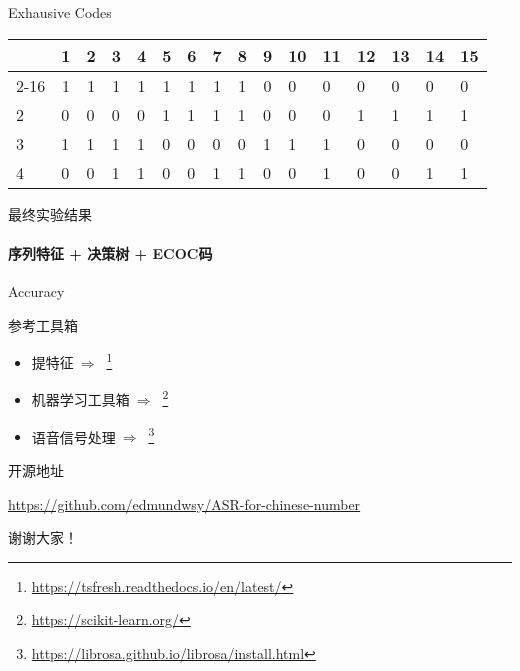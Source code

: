\documentclass[aspectratio=169, 13pt,compress]{beamer}
\begin{document}
\begin{frame}{Exhausive Codes}
    \begin{table}[]
\begin{tabular}{llllllllllllllll}
\multicolumn{1}{c}{}   & \multicolumn{1}{c}{1} & \multicolumn{1}{c}{2} & \multicolumn{1}{c}{3} & \multicolumn{1}{c}{4} & \multicolumn{1}{c}{5} & \multicolumn{1}{c}{6} & \multicolumn{1}{c}{7} & \multicolumn{1}{c}{8} & \multicolumn{1}{c}{9} & 10 & 11 & 12 & 13 & 14 & 15 \\ \cline{2-16} 
\multicolumn{1}{c|}{1} & \multicolumn{1}{c}{1} & \multicolumn{1}{c}{1} & \multicolumn{1}{c}{1} & \multicolumn{1}{c}{1} & \multicolumn{1}{c}{1} & \multicolumn{1}{c}{1} & \multicolumn{1}{c}{1} & \multicolumn{1}{c}{1} & \multicolumn{1}{c}{0} & 0  & 0  & 0  & 0  & 0  & 0  \\
\multicolumn{1}{l|}{2} & 0                     & 0                     & 0                     & 0                     & 1                     & 1                     & 1                     & 1                     & 0                     & 0  & 0  & 1  & 1  & 1  & 1  \\
\multicolumn{1}{l|}{3} & 1                     & 1                     & 1                     & 1                     & 0                     & 0                     & 0                     & 0                     & 1                     & 1  & 1  & 0  & 0  & 0  & 0  \\
\multicolumn{1}{l|}{4} & 0                     & 0                     & 1                     & 1                     & 0                     & 0                     & 1                     & 1                     & 0                     & 0  & 1  & 0  & 0  & 1  & 1 
\end{tabular}
\end{table}
\end{frame}

\begin{frame}{最终实验结果}
\framesubtitle{序列特征 + 决策树 + ECOC码}
\centering

    \Huge Accuracy \hspace{4cm} 
\end{frame}

\begin{frame}{参考工具箱}
\begin{itemize}
    \item 提特征$~ \Longrightarrow~$  \footnote{ \url{https://tsfresh.readthedocs.io/en/latest/}}
    \item 机器学习工具箱$~ \Longrightarrow~$  \footnote{ \url{https://scikit-learn.org/}}
    \item 语音信号处理$~ \Longrightarrow~$  \footnote{ \url{https://librosa.github.io/librosa/install.html}}

\end{itemize}
    
\end{frame}

\begin{frame}{开源地址}
    \par
    \url{https://github.com/edmundwsy/ASR-for-chinese-number}
\end{frame}


\begin{frame}
    \centering
    \Huge
    \textcolor{DoderBlue}{谢谢大家！}
\end{frame}
\end{document}
